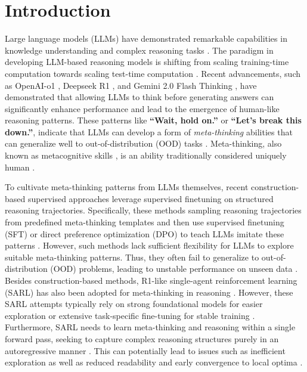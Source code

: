 
\section{Introduction}
Large language models (LLMs) have demonstrated remarkable capabilities in knowledge understanding and complex reasoning tasks  \citep{chowdhery2023palm, achiam2023gpt, anil2023gemini, dubey2024llama}. The paradigm in developing LLM-based reasoning models is shifting from scaling training-time computation towards scaling test-time computation \citep{snell2024scaling}. Recent advancements, such as OpenAI-o1 \citep{openai2024o1}, Deepseek R1 \citep{r1}, and Gemini 2.0 Flash Thinking \citep{deepmind_gemini_flash}, have demonstrated that allowing LLMs to think before generating answers can significantly enhance performance and lead to the emergence of human-like reasoning patterns. These patterns like \textbf{``Wait, hold on.''} or \textbf{``Let's break this down.''}, indicate that LLMs can develop a form of \textit{meta-thinking} abilities that can generalize well to out-of-distribution (OOD) tasks \citep{xiang2025towards}. Meta-thinking, also known as metacognitive skills \citep{flavell1979metacognition}, is an ability traditionally considered uniquely human \citep{didolkar2024metacognitive}. 


To cultivate meta-thinking patterns from LLMs themselves, recent construction-based supervised approaches leverage supervised finetuning on structured reasoning trajectories.
Specifically, these methods sampling reasoning trajectories from predefined meta-thinking templates and then use supervised finetuning (SFT) or direct preference optimization (DPO) \citep{rafailov2023direct} to teach LLMs imitate these patterns \citep{qi2024mutual, yuedots, xi2024enhancing, yang2025reasonflux, muennighoff2025s1,ye2025limo}.
However, such methods lack sufficient flexibility for LLMs to explore suitable meta-thinking patterns. Thus, they often fail to generalize to out-of-distribution (OOD) problems, leading to unstable performance on unseen data \citep{kirkunderstanding,chu2025sft}.
Besides construction-based methods, R1-like single-agent reinforcement learning (SARL) has also been adopted for meta-thinking in reasoning \citep{r1,xie2025logic}.
However, these SARL attempts typically rely on strong foundational models for easier exploration or extensive task-specific fine-tuning for stable training \citep{xu2025towards,gandhi2025cognitivebehaviorsenableselfimproving}. Furthermore, SARL needs to learn meta-thinking and reasoning within a single forward pass, seeking to capture complex reasoning structures purely in an autoregressive manner \citep{xie2025logic}. This can potentially lead to issues such as inefficient exploration as well as reduced readability and early convergence to local optima \citep{r1,xiang2025towards}. 


